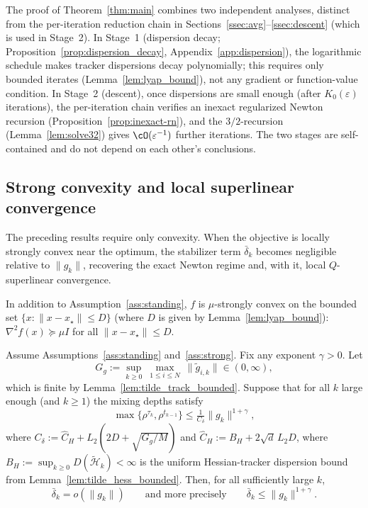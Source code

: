 \documentclass[review,onefignum,onetabnum]{siamart171218}
\begin{document}
\begin{remark}\label{rem:two_stages}
The proof of Theorem~\ref{thm:main} combines two independent
analyses, distinct from the per-iteration reduction chain in
Sections~\ref{ssec:avg}--\ref{ssec:descent} (which is used in Stage~2).
In Stage~1 (dispersion decay;
Proposition~\ref{prop:dispersion_decay},
Appendix~\ref{app:dispersion}), the logarithmic schedule
makes tracker dispersions decay polynomially; this requires only
bounded iterates (Lemma~\ref{lem:lyap_bound}), not any gradient
or function-value condition.
In Stage~2 (descent), once dispersions are small enough
(after $K_0(\varepsilon)$ iterations), the per-iteration chain
verifies an inexact regularized Newton recursion
(Proposition~\ref{prop:inexact-rn}), and the $3/2$-recursion
(Lemma~\ref{lem:solve32}) gives $\cO(\varepsilon^{-1})$ further
iterations.
The two stages are self-contained and do not depend on each other's conclusions.
\end{remark}

\subsection{Strong convexity and local superlinear convergence}\label{ssec:superlinear}
The preceding results require only convexity.
When the objective is locally strongly convex near the optimum,
the stabilizer term $\bar\delta_k$ becomes negligible relative to
$\|g_k\|$, recovering the exact Newton regime and, with it, local
$Q$-superlinear convergence.

\begin{assumption}\label{ass:strong}
In addition to Assumption~\ref{ass:standing}, $f$ is $\mu$-strongly convex on the bounded set
$\{x:\|x-x_\star\|\le D\}$ (where $D$ is given by Lemma~\ref{lem:lyap_bound}):
$\nabla^2 f(x)\succeq \mu I$ for all $\|x-x_\star\|\le D$.
\end{assumption}

\begin{lemma}\label{lem:delta_o_g}
Assume Assumptions~\ref{ass:standing} and~\ref{ass:strong}.
Fix any exponent $\gamma>0$.
Let
\[
G_g:=\sup_{k\ge 0}\ \max_{1\le i\le N}\ \|\tilde g_{i,k}\|\in(0,\infty),
\]
which is finite by Lemma~\ref{lem:tilde_track_bounded}.
Suppose that for all $k$ large enough (and $k\ge 1$) the mixing depths satisfy
\begin{equation}\label{eq:delta_schedule}
\max\{\rho^{\tau_k},\rho^{t_{k-1}}\}\le \tfrac{1}{C_\delta}\|g_k\|^{1+\gamma},
\end{equation}
where $C_\delta:=\hat C_H+L_2(2D+\sqrt{G_g/M})$ and $\hat C_H:=B_H+2\sqrt{d}\,L_2D$,
where $B_H:=\sup_{k\ge0}D(\tilde{\mathcal H}_k)<\infty$
is the uniform Hessian-tracker dispersion bound from Lemma~\ref{lem:tilde_hess_bounded}.
Then, for all sufficiently large $k$,
\[
\bar\delta_k = o(\|g_k\|)\qquad\text{and more precisely}\qquad \bar\delta_k\le \|g_k\|^{1+\gamma}.
\]
\end{lemma}
\end{document}
